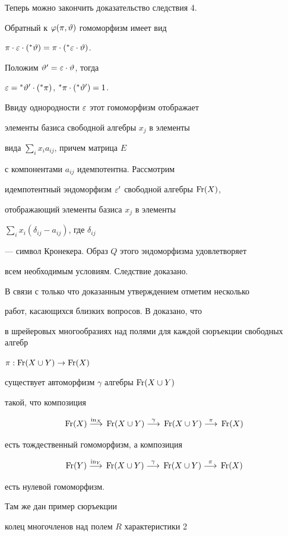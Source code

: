 Теперь можно закончить доказательство следствия 4.


Обратный к $\varphi(\pi,\vartheta)$ гомоморфизм имеет вид


$\pi\cdot\varepsilon\cdot({}^{\ast}{\vartheta})=\pi\cdot({}^{\ast}{\varepsilon\cdot\vartheta})$.


Положим $\vartheta'=\varepsilon\cdot\vartheta$, тогда


$\varepsilon = {}^{\ast}{\vartheta'}\cdot ({}^{\ast}{\pi})$, ${}^{\ast}{\pi}\cdot ({}^{\ast}{\vartheta'})=1$.


Ввиду однородности $\varepsilon$ этот гомоморфизм отображает


элементы базиса свободной алгебры $x_j$ в элементы


вида $\sum\limits_i x_i a_{ij} $, причем матрица $E$


с компонентами $a_{ij}$ идемпотентна. Рассмотрим


идемпотентный эндоморфизм $\varepsilon'$ свободной алгебры $\operatorname{Fr}(X)$,


отображающий элементы базиса $x_j$ в элементы


$\sum\limits_i x_i(\delta_{ij}-a_{ij})$, где $\delta_{ij}$


--- символ Кронекера. Образ $Q$ этого эндоморфизма удовлетворяет


всем необходимым условиям. Следствие доказано.





В связи с только что доказанным утверждением отметим несколько


работ, касающихся близких вопросов. В \cite{Bur} доказано, что


в шрейеровых многообразиях над полями для каждой сюръекции свободных алгебр


$\pi:\operatorname{Fr}(X\cup Y)\to \operatorname{Fr}(X)$


существует автоморфизм $\gamma$ алгебры $\operatorname{Fr}(X\cup Y)$


такой, что композиция


$$


\Fr(X)\ar{\In_X} \Fr(X\cup Y)\ar{\gamma} \Fr(X\cup Y)\ar{\pi} \Fr(X)


$$


есть тождественный гомоморфизм, а композиция


$$


\Fr(Y)\ar{\In_Y} \Fr(X\cup Y)\ar{\gamma} \Fr(X\cup Y)\ar{\pi} \Fr(X)


$$


есть нулевой гомоморфизм.


Там же дан пример сюръекции


колец многочленов над полем $R$ характеристики 2



